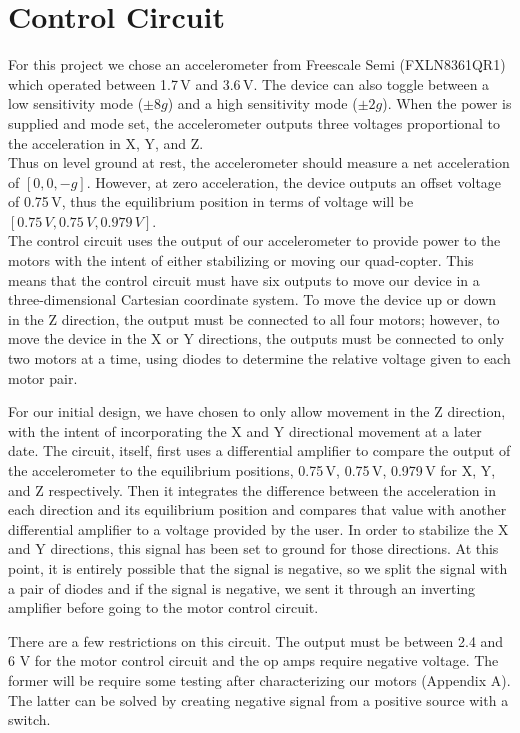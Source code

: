 \section{Control Circuit}

For this project we chose an accelerometer from Freescale Semi (FXLN8361QR1) which operated between 1.7\,V and 3.6\,V. The device can also toggle between a low sensitivity mode ($\pm8g$) and a high sensitivity mode ($\pm2g$). When the power is supplied and mode set, the accelerometer outputs three voltages proportional to the acceleration in X, Y, and Z.\\

Thus on level ground at rest, the accelerometer should measure a net acceleration of $[0,0,-g]$. However, at zero acceleration, the device outputs an offset voltage of 0.75\,V, thus the equilibrium position in terms of voltage will be $[0.75\,V,0.75\,V,0.979\,V]$.\\

The control circuit uses the output of our accelerometer to provide power to the motors with the intent of either stabilizing or moving our quad-copter. This means that the control circuit must have six outputs to move our device in a three-dimensional Cartesian coordinate system. To move the device up or down in the Z direction, the output must be connected to all four motors; however, to move the device in the X or Y directions, the outputs must be connected to only two motors at a time, using diodes to determine the relative voltage given to each motor pair. 

For our initial design, we have chosen to only allow movement in the Z direction, with the intent of incorporating the X and Y directional movement at a later date. The circuit, itself, first uses a differential amplifier to compare the output of the accelerometer to the equilibrium positions, 0.75\,V, 0.75\,V, 0.979\,V for X, Y, and Z respectively. Then it integrates the difference between the acceleration in each direction and its equilibrium position and compares that value with another differential amplifier to a voltage provided by the user. In order to stabilize the X and Y directions, this signal has been set to ground for those directions. At this point, it is entirely possible that the signal is negative, so we split the signal with a pair of diodes and if the signal is negative, we sent it through an inverting amplifier before going to the motor control circuit.

There are a few restrictions on this circuit. The output must be between 2.4 and 6 V for the motor control circuit and the op amps require negative voltage. The former will be require some testing after characterizing our motors (Appendix A). The latter can be solved by creating negative signal from a positive source with a switch.

